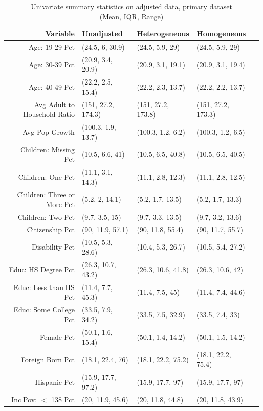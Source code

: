 \begin{table}[h!]
\centering
\caption{Univariate summary statistics on adjusted data, primary dataset \\ (Mean, IQR, Range)}\label{tab:summarytab1}
\begin{tabular}{rllll}
  \hline
Variable & Unadjusted & Heterogeneous & Homogeneous \\ 
  \hline
  Age: 19-29 Pct & (24.5, 6, 30.9) & (24.5, 5.9, 29) & (24.5, 5.9, 29) \\ 
  Age: 30-39 Pct & (20.9, 3.4, 20.9) & (20.9, 3.1, 19.1) & (20.9, 3.1, 19.4) \\ 
  Age: 40-49 Pct & (22.2, 2.5, 15.4) & (22.2, 2.3, 13.7) & (22.2, 2.2, 13.7) \\ 
  Avg Adult to Household Ratio & (151, 27.2, 174.3) & (151, 27.2, 173.8) & (151, 27.2, 173.3) \\ 
  Avg Pop Growth & (100.3, 1.9, 13.7) & (100.3, 1.2, 6.2) & (100.3, 1.2, 6.5) \\ 
  Children: Missing Pct & (10.5, 6.6, 41) & (10.5, 6.5, 40.8) & (10.5, 6.5, 40.5) \\ 
  Children: One Pct & (11.1, 3.1, 14.3) & (11.1, 2.8, 12.3) & (11.1, 2.8, 12.5) \\ 
  Children: Three or More Pct & (5.2, 2, 14.1) & (5.2, 1.7, 13.5) & (5.2, 1.7, 13.3) \\ 
  Children: Two Pct & (9.7, 3.5, 15) & (9.7, 3.3, 13.5) & (9.7, 3.2, 13.6) \\ 
  Citizenship Pct & (90, 11.9, 57.1) & (90, 11.8, 55.4) & (90, 11.7, 55.7) \\ 
  Disability Pct & (10.5, 5.3, 28.6) & (10.4, 5.3, 26.7) & (10.5, 5.4, 27.2) \\ 
  Educ: HS Degree Pct & (26.3, 10.7, 43.2) & (26.3, 10.6, 41.8) & (26.3, 10.6, 42) \\ 
  Educ: Less than HS Pct & (11.4, 7.7, 45.3) & (11.4, 7.5, 45) & (11.4, 7.4, 44.6) \\ 
  Educ: Some College Pct & (33.5, 7.9, 34.2) & (33.5, 7.5, 32.9) & (33.5, 7.4, 33) \\ 
  Female Pct & (50.1, 1.6, 15.4) & (50.1, 1.4, 14.2) & (50.1, 1.5, 14.2) \\ 
  Foreign Born Pct & (18.1, 22.4, 76) & (18.1, 22.2, 75.2) & (18.1, 22.2, 75.4) \\ 
  Hispanic Pct & (15.9, 17.7, 97.2) & (15.9, 17.7, 97) & (15.9, 17.7, 97) \\ 
  Inc Pov: $<$ 138 Pct & (20, 11.9, 45.6) & (20, 11.8, 44.8) & (20, 11.8, 43.9) \\ 

\end{tabular}
\end{table}
